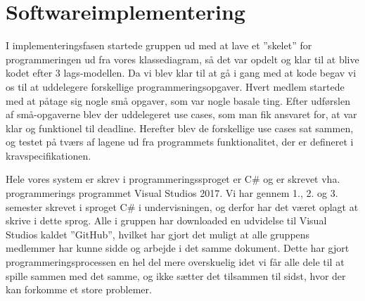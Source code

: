 \section{Softwareimplementering}
I implementeringsfasen startede gruppen ud med at lave et ”skelet” for programmeringen ud fra vores klassediagram, så det var opdelt og klar til at blive kodet efter 3 lags-modellen. Da vi blev klar til at gå i gang med at kode begav vi os til at uddelegere forskellige programmeringsopgaver. Hvert medlem startede med at påtage sig nogle små opgaver, som var nogle basale ting. Efter udførslen af små-opgaverne blev der uddelegeret use cases, som man fik ansvaret for, at var klar og funktionel til deadline. Herefter blev de forskellige use cases sat sammen, og testet på tværs af lagene ud fra programmets funktionalitet, der er defineret i kravspecifikationen. 

Hele vores system er skrev i programmeringssproget er C\# og er skrevet vha. programmerings programmet Visual Studios 2017.  Vi har gennem 1., 2. og 3. semester skrevet i sproget C\# i undervisningen, og derfor har det været oplagt at skrive i dette sprog. Alle i gruppen har downloaded en udvidelse til Visual Studios kaldet ”GitHub”, hvilket har gjort det muligt at alle gruppens medlemmer har kunne sidde og arbejde i det samme dokument. Dette har gjort programmeringsprocessen en hel del mere overskuelig idet vi får alle dele til at spille sammen med det samme, og ikke sætter det tilsammen til sidst, hvor der kan forkomme et store problemer.
